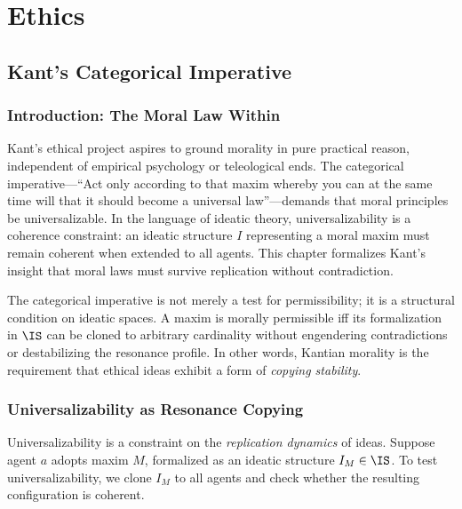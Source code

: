
\part{Ethics}

\chapter{Kant's Categorical Imperative}
\label{ch:kant}

\section{Introduction: The Moral Law Within}

Kant's ethical project aspires to ground morality in pure practical reason, independent of empirical psychology or teleological ends. The categorical imperative—``Act only according to that maxim whereby you can at the same time will that it should become a universal law''—demands that moral principles be universalizable. In the language of ideatic theory, universalizability is a coherence constraint: an ideatic structure $I$ representing a moral maxim must remain coherent when extended to all agents. This chapter formalizes Kant's insight that moral laws must survive replication without contradiction.

\begin{interpretation}
The categorical imperative is not merely a test for permissibility; it is a structural condition on ideatic spaces. A maxim is morally permissible iff its formalization in $\IS$ can be cloned to arbitrary cardinality without engendering contradictions or destabilizing the resonance profile. In other words, Kantian morality is the requirement that ethical ideas exhibit a form of \emph{copying stability}.
\end{interpretation}

\section{Universalizability as Resonance Copying}

Universalizability is a constraint on the \emph{replication dynamics} of ideas. Suppose agent $a$ adopts maxim $M$, formalized as an ideatic structure $I_M \in \IS$. To test universalizability, we clone $I_M$ to all agents and check whether the resulting configuration is coherent.

